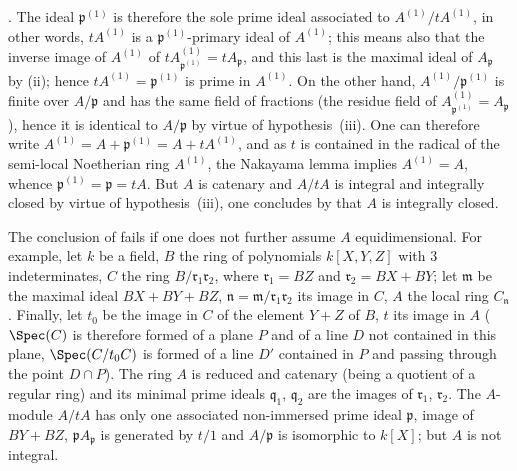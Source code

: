 
.
The ideal $\mathfrak{p}^{(1)}$ is therefore the sole prime ideal associated to $A^{(1)}/tA^{(1)}$, in other words, $tA^{(1)}$ is a $\mathfrak{p}^{(1)}$-primary ideal of $A^{(1)}$; this means also that the inverse image of $A^{(1)}$ of $tA^{(1)}_{\mathfrak{p}^{(1)}}=tA_\mathfrak{p}$, and this last is the maximal ideal of $A_\mathfrak{p}$ by (ii); hence $tA^{(1)}=\mathfrak{p}^{(1)}$ is prime in $A^{(1)}$.
On the other hand, $A^{(1)}/\mathfrak{p}^{(1)}$ is finite over $A/\mathfrak{p}$ and has the same field of fractions (the residue field of $A^{(1)}_{\mathfrak{p}^{(1)}}=A_\mathfrak{p}$), hence it is identical to $A/\mathfrak{p}$ by virtue of hypothesis~(iii).
One can therefore write $A^{(1)}=A+\mathfrak{p}^{(1)}=A+tA^{(1)}$, and as $t$ is contained in the radical of the semi-local Noetherian ring $A^{(1)}$, the Nakayama lemma implies $A^{(1)}=A$, whence $\mathfrak{p}^{(1)}=\mathfrak{p}=tA$.
But $A$ is catenary and $A/tA$ is integral and integrally closed by virtue of hypothesis~(iii), one concludes by  that $A$ is integrally closed.

\begin{remark}[5.12.9]
\label{IV.5.12.9}
The conclusion of  fails if one does not further assume $A$ equidimensional.
For example, let $k$ be a field, $B$ the ring of polynomials $k[X,Y,Z]$ with $3$ indeterminates, $C$ the ring $B/\mathfrak{r}_1\mathfrak{r}_2$, where $\mathfrak{r}_1=BZ$ and $\mathfrak{r}_2=BX+BY$; let $\mathfrak{m}$ be the maximal ideal $BX+BY+BZ$, $\mathfrak{n}=\mathfrak{m}/\mathfrak{r}_1\mathfrak{r}_2$ its image in $C$, $A$ the local ring $C_\mathfrak{n}$.
Finally, let $t_0$ be the image in $C$ of the element $Y+Z$ of $B$, $t$ its image in $A$ ($\Spec(C)$ is therefore formed of a plane $P$ and of a line $D$ not contained in this plane, $\Spec(C/t_0C)$ is formed of a line $D'$ contained in $P$ and passing through the point $D\cap P$).
The ring $A$ is reduced and catenary (being a quotient of a regular ring) and its minimal prime ideals $\mathfrak{q}_1$, $\mathfrak{q}_2$ are the images of $\mathfrak{r}_1$, $\mathfrak{r}_2$.
The $A$-module $A/tA$ has only one associated non-immersed prime ideal $\mathfrak{p}$, image of $BY+BZ$, $\mathfrak{p}A_\mathfrak{p}$ is generated by $t/1$ and $A/\mathfrak{p}$ is isomorphic to $k[X]$; but $A$ is not integral.
\end{remark}

